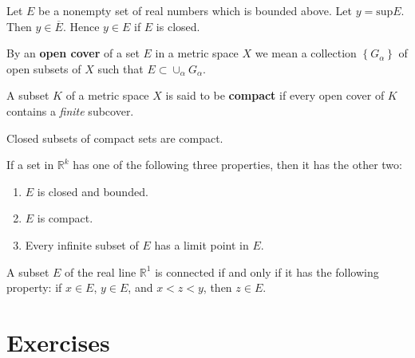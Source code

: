 \setcounter{theorem}{27}
\begin{theorem}
	\label{theorem-2.28}
	Let $E$ be a nonempty set of real numbers which is bounded above. Let $y = \text{sup} E$. Then $y \in \overline{E}$. Hence $y \in E$ if $E$ is closed.
\end{theorem}

\setcounter{theorem}{30}
\begin{definition}
	\label{theorem-2.31}
	By an \textbf{\gls{open cover}} of a set $E$ in a metric space $X$ we mean a collection $\left\lbrace G_\alpha \right\rbrace$ of open subsets of $X$ such that $E \subset \cup_\alpha G_\alpha$.
\end{definition}

\begin{definition}
	A subset $K$ of a metric space $X$ is said to be \textbf{\gls{compact}} if every open cover of $K$ contains a \textit{finite} subcover.
\end{definition}

\setcounter{theorem}{34}
\begin{theorem}
	\label{theorem-2.35}
	Closed subsets of compact sets are compact.
\end{theorem}

\setcounter{theorem}{40}
\begin{theorem}
	\label{theorem-2.41}
	If a set in $\mathbb{R}^k$ has one of the following three properties, then it has the other two:
	\renewcommand{\labelenumi}{(\alph{enumi})}
	\begin{enumerate}
		\item $E$ is closed and bounded.
		\item $E$ is compact.
		\item Every infinite subset of $E$ has a limit point in $E$.
	\end{enumerate}
\end{theorem}

\setcounter{theorem}{46}
\begin{theorem}
	\label{theorem-2.47}
	A subset $E$ of the real line $\mathbb{R}^1$ is connected if and only if it has the following property: if $x \in E$, $y \in E$, and $x < z < y$, then $z \in E$.
\end{theorem}

\section{Exercises}







